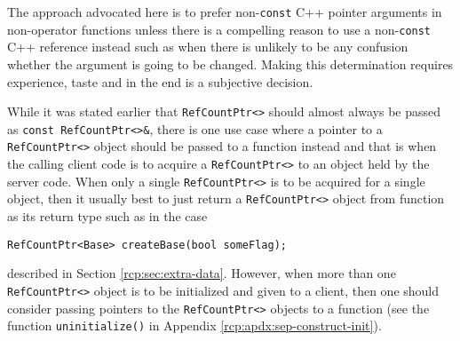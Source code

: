 The approach advocated here is to prefer non-\texttt{const} C++
pointer arguments in non-operator functions unless there is a
compelling reason to use a non-\texttt{const} C++ reference instead
such as when there is unlikely to be any confusion whether the
argument is going to be changed.  Making this determination requires
experience, taste and in the end is a subjective decision.

While it was stated earlier that {}\texttt{Ref\-Count\-Ptr<>} should
almost always be passed as {}\texttt{const Ref\-Count\-Ptr<>\&}, there
is one use case where a pointer to a {}\texttt{Ref\-Count\-Ptr<>}
object should be passed to a function instead and that is when the
calling client code is to acquire a {}\texttt{Ref\-Count\-Ptr<>} to an
object held by the server code.  When only a single
{}\texttt{Ref\-Count\-Ptr<>} is to be acquired for a single object,
then it usually best to just return a {}\texttt{Ref\-Count\-Ptr<>}
object from function as its return type such as in the case

{\scriptsize\begin{verbatim}
RefCountPtr<Base> createBase(bool someFlag);
\end{verbatim}}

{}\noindent{}described in Section {}\ref{rcp:sec:extra-data}.
However, when more than one {}\texttt{Ref\-Count\-Ptr<>} object is to
be initialized and given to a client, then one should consider passing
pointers to the {}\texttt{Ref\-Count\-Ptr<>} objects to a function
(see the function {}\texttt{uninitialize()} in Appendix
{}\ref{rcp:apdx:sep-construct-init}).
